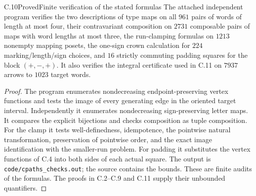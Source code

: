 \begin{claim}{C.10}{Proved}{Finite verification of the stated formulas}
The attached independent program verifies the two descriptions of
type maps on all $961$ pairs of words of length at most four, their
contravariant composition on $2731$ composable pairs of maps with
word lengths at most three, the run-clamping formulas on $1213$
nonempty mapping posets, the one-sign crown calculation for $224$
marking/length/sign choices, and $16$ strictly commuting padding
squares for the block $(+,-,+)$. It also verifies the integral
certificate used in C.11 on $7937$ arrows to $1023$ target words.
\end{claim}
\begin{proof}
The program enumerates nondecreasing endpoint-preserving vertex
functions and tests the image of every generating edge in the
oriented target interval. Independently it enumerates nondecreasing
sign-preserving letter maps. It compares the explicit bijections
and checks composition as tuple composition. For the clamp it tests
well-definedness, idempotence, the pointwise natural transformation,
preservation of pointwise order, and the exact image identification
with the smaller-run problem. For padding it substitutes the
vertex functions of C.4 into both sides of each actual square.
The output is \texttt{code/cpaths\_checks.out}; the source contains
the bounds. These are finite audits of the formulas. The proofs in
C.2--C.9 and C.11 supply their unbounded quantifiers.
\end{proof}


